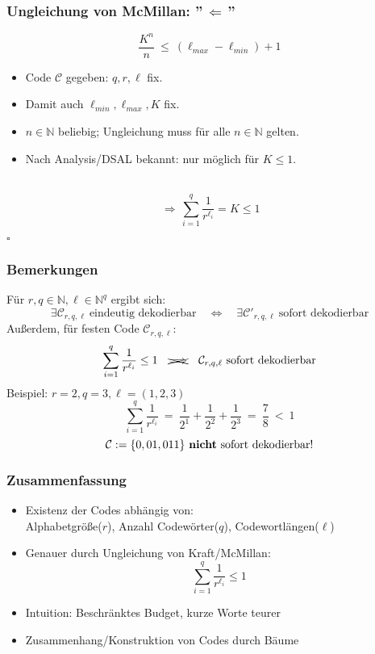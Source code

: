 \documentclass{beamer}
\begin{document}
\begin{frame}[t]
    \frametitle{Ungleichung von McMillan: ''$\,\Longleftarrow\,$''}
        $$
            \frac{K^n}{n}\ \leq\ (\ell_{max}-\ell_{min}) + 1
        $$
        \begin{itemize}
            \setlength\itemsep{1em}
            \item Code $\mathcal{C}$ gegeben: $q,r,\ell$ fix.
            \item Damit auch $\ell_{min},\ell_{max}, K$ fix.
            \pause
            \item $n \in \mathbb{N}$ beliebig; Ungleichung muss für alle $n \in \mathbb{N}$ gelten.
            \item Nach Analysis/DSAL bekannt: nur möglich für $K \leq 1$.
        \end{itemize}
        \strut\\
        $$
            \,\Longrightarrow\, \sum_{i=1}^{q} \frac{1}{r^{\ell_i}} = K \leq 1
        $$
        \strut\hfill$\square$
\end{frame}

\begin{frame}[t]
    \frametitle{Bemerkungen}
    Für $r,q \in \mathbb{N}, \ell \in \mathbb{N}^q$ ergibt sich:
    $$
        \exists \mathcal{C}_{r,q,\ell}\ \text{eindeutig dekodierbar}
        \quad\Longleftrightarrow\quad
        \exists \mathcal{C}'_{r,q,\ell}\ \text{sofort dekodierbar}
    $$
    \pause
    Außerdem, für festen Code $\mathcal{C}_{r,q,\ell}:$
    $$
        \sum_{i=1}^{q} \frac{1}{r^{\ell_i}} \leq 1
        \quad\xcancel{\Longrightarrow}\quad
        \mathcal{C}_{r,q,\ell}\ \text{sofort dekodierbar}
    $$
    \pause
    Beispiel: $r=2,q=3,\ell=(1,2,3)$
    $$
        \sum_{i=1}^{q} \frac{1}{r^{\ell_i}}
        \ =\ \frac{1}{2^1} + \frac{1}{2^2} + \frac{1}{2^3}
        \ =\ \frac{7}{8}
        \ <\ 1
    $$
    $$
        \mathcal{C} := \{0,01,011\}\ \text{\textbf{nicht} sofort dekodierbar!}
    $$
\end{frame}


\begin{frame}[t]
    \frametitle{Zusammenfassung}

    \begin{itemize}
        \setlength\itemsep{1em}
        \item Existenz der Codes abhängig von:\\
            Alphabetgröße($r$), Anzahl Codewörter($q$), Codewortlängen($\ell$)
        \item Genauer durch Ungleichung von Kraft/McMillan:
            $$
                \sum_{i=1}^{q} \frac{1}{r^{\ell_i}} \leq 1
            $$
        \item Intuition: Beschränktes Budget, kurze Worte teurer
        \item Zusammenhang/Konstruktion von Codes durch Bäume
    \end{itemize}

\end{frame}
\end{document}
